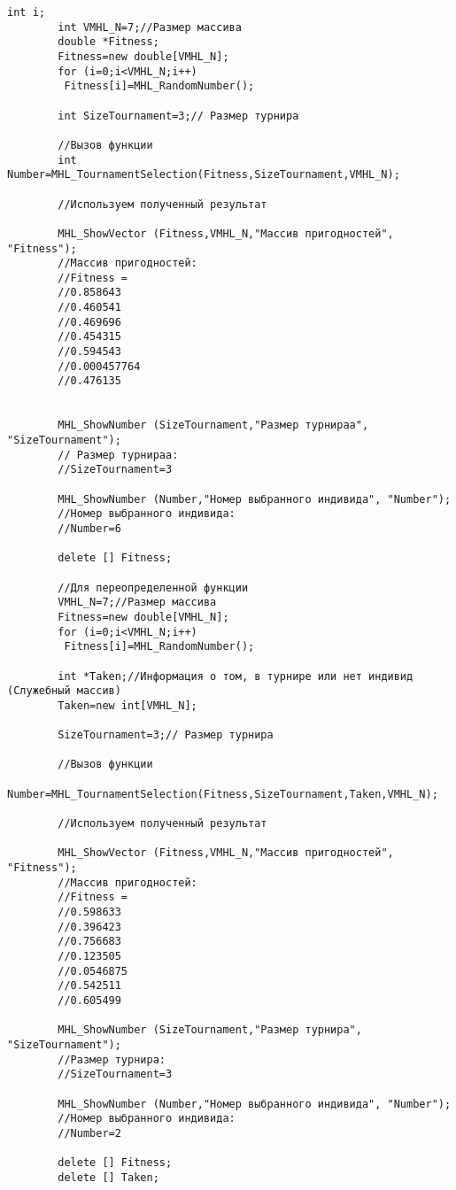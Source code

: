 \documentclass[a4paper,12pt]{article}
\begin{document}
\begin{lstlisting}[label=code_use_MHL_TournamentSelection,caption=Пример использования]
        int i;
        int VMHL_N=7;//Размер массива
        double *Fitness;
        Fitness=new double[VMHL_N];
        for (i=0;i<VMHL_N;i++)
         Fitness[i]=MHL_RandomNumber();

        int SizeTournament=3;// Размер турнира

        //Вызов функции
        int Number=MHL_TournamentSelection(Fitness,SizeTournament,VMHL_N);

        //Используем полученный результат

        MHL_ShowVector (Fitness,VMHL_N,"Массив пригодностей", "Fitness");
        //Массив пригодностей:
        //Fitness =
        //0.858643
        //0.460541
        //0.469696
        //0.454315
        //0.594543
        //0.000457764
        //0.476135


        MHL_ShowNumber (SizeTournament,"Размер турнираа", "SizeTournament");
        // Размер турнираа:
        //SizeTournament=3

        MHL_ShowNumber (Number,"Номер выбранного индивида", "Number");
        //Номер выбранного индивида:
        //Number=6

        delete [] Fitness;

        //Для переопределенной функции
        VMHL_N=7;//Размер массива
        Fitness=new double[VMHL_N];
        for (i=0;i<VMHL_N;i++)
         Fitness[i]=MHL_RandomNumber();

        int *Taken;//Информация о том, в турнире или нет индивид (Служебный массив)
        Taken=new int[VMHL_N];

        SizeTournament=3;// Размер турнира

        //Вызов функции
        Number=MHL_TournamentSelection(Fitness,SizeTournament,Taken,VMHL_N);

        //Используем полученный результат

        MHL_ShowVector (Fitness,VMHL_N,"Массив пригодностей", "Fitness");
        //Массив пригодностей:
        //Fitness =
        //0.598633
        //0.396423
        //0.756683
        //0.123505
        //0.0546875
        //0.542511
        //0.605499

        MHL_ShowNumber (SizeTournament,"Размер турнира", "SizeTournament");
        //Размер турнира:
        //SizeTournament=3

        MHL_ShowNumber (Number,"Номер выбранного индивида", "Number");
        //Номер выбранного индивида:
        //Number=2

        delete [] Fitness;
        delete [] Taken;
\end{lstlisting}
\end{document}
